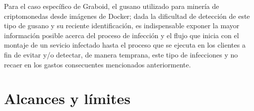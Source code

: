 \documentclass[../main/main.tex]{subfiles}
\begin{document}
  Para el caso específico de Graboid, el gusano utilizado para minería de criptomonedas desde imágenes de Docker; dada la dificultad de detección de este tipo de gusano y su reciente identificación, es indispensable exponer la mayor información posible acerca del proceso de infección y el flujo que inicia con el montaje de un sevicio infectado hasta el proceso que se ejecuta en los clientes a fin de evitar y/o detectar, de manera temprana, este tipo de infecciones y no recaer en los gastos consecuentes mencionados anteriormente.

  \section{Alcances y límites}
\end{document}
